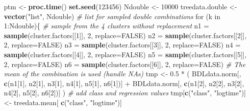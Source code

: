 \documentclass[]{article}
\newenvironment{Shaded}{\begin{snugshade}}{\end{snugshade}}
\newcommand{\KeywordTok}[1]{\textcolor[rgb]{0.13,0.29,0.53}{\textbf{{#1}}}}
\newcommand{\DataTypeTok}[1]{\textcolor[rgb]{0.13,0.29,0.53}{{#1}}}
\newcommand{\DecValTok}[1]{\textcolor[rgb]{0.00,0.00,0.81}{{#1}}}
\newcommand{\FloatTok}[1]{\textcolor[rgb]{0.00,0.00,0.81}{{#1}}}
\newcommand{\StringTok}[1]{\textcolor[rgb]{0.31,0.60,0.02}{{#1}}}
\newcommand{\CommentTok}[1]{\textcolor[rgb]{0.56,0.35,0.01}{\textit{{#1}}}}
\newcommand{\OtherTok}[1]{\textcolor[rgb]{0.56,0.35,0.01}{{#1}}}
\newcommand{\NormalTok}[1]{{#1}}
\begin{document}
\begin{Shaded}
\begin{Highlighting}[]
\NormalTok{ptm <-}\StringTok{ }\KeywordTok{proc.time}\NormalTok{()}
\KeywordTok{set.seed}\NormalTok{(}\DecValTok{123456}\NormalTok{)}
\NormalTok{Ndouble <-}\StringTok{ }\DecValTok{10000}
\NormalTok{treedata.double <-}\StringTok{ }\KeywordTok{vector}\NormalTok{(}\StringTok{"list"}\NormalTok{, Ndouble)  }\CommentTok{# list for sampled double combinations}
\NormalTok{for (k in }\DecValTok{1}\NormalTok{:Ndouble)\{}
  \CommentTok{# sample from the 4 clusters without replacement}
  \NormalTok{n1 =}\StringTok{ }\KeywordTok{sample}\NormalTok{(cluster.factors[[}\DecValTok{1}\NormalTok{]], }\DecValTok{2}\NormalTok{, }\DataTypeTok{replace=}\OtherTok{FALSE}\NormalTok{)  }
  \NormalTok{n2 =}\StringTok{ }\KeywordTok{sample}\NormalTok{(cluster.factors[[}\DecValTok{2}\NormalTok{]], }\DecValTok{2}\NormalTok{, }\DataTypeTok{replace=}\OtherTok{FALSE}\NormalTok{)  }
  \NormalTok{n3 =}\StringTok{ }\KeywordTok{sample}\NormalTok{(cluster.factors[[}\DecValTok{3}\NormalTok{]], }\DecValTok{2}\NormalTok{, }\DataTypeTok{replace=}\OtherTok{FALSE}\NormalTok{)  }
  \NormalTok{n4 =}\StringTok{ }\KeywordTok{sample}\NormalTok{(cluster.factors[[}\DecValTok{4}\NormalTok{]], }\DecValTok{2}\NormalTok{, }\DataTypeTok{replace=}\OtherTok{FALSE}\NormalTok{)  }
  \NormalTok{n5 =}\StringTok{ }\KeywordTok{sample}\NormalTok{(cluster.factors[[}\DecValTok{5}\NormalTok{]], }\DecValTok{2}\NormalTok{, }\DataTypeTok{replace=}\OtherTok{FALSE}\NormalTok{)  }
  \NormalTok{n6 =}\StringTok{ }\KeywordTok{sample}\NormalTok{(cluster.factors[[}\DecValTok{6}\NormalTok{]], }\DecValTok{2}\NormalTok{, }\DataTypeTok{replace=}\OtherTok{FALSE}\NormalTok{)  }
  \CommentTok{# The mean of the combination is used (handle NAs)}
  \NormalTok{tmp <-}\StringTok{ }\FloatTok{0.5} \NormalTok{*}\StringTok{ }\NormalTok{(  BDLdata.norm[, }\KeywordTok{c}\NormalTok{(n1[}\DecValTok{1}\NormalTok{], n2[}\DecValTok{1}\NormalTok{], n3[}\DecValTok{1}\NormalTok{], n4[}\DecValTok{1}\NormalTok{], n5[}\DecValTok{1}\NormalTok{], n6[}\DecValTok{1}\NormalTok{])] }
                \NormalTok{+}\StringTok{ }\NormalTok{BDLdata.norm[, }\KeywordTok{c}\NormalTok{(n1[}\DecValTok{2}\NormalTok{], n2[}\DecValTok{2}\NormalTok{], n3[}\DecValTok{2}\NormalTok{], n4[}\DecValTok{2}\NormalTok{], n5[}\DecValTok{2}\NormalTok{], n6[}\DecValTok{2}\NormalTok{])] )}
   \CommentTok{# add class and regression values}
  \NormalTok{tmp[}\KeywordTok{c}\NormalTok{(}\StringTok{"class"}\NormalTok{, }\StringTok{"logtime"}\NormalTok{)] <-}\StringTok{ }\NormalTok{treedata.mean[ }\KeywordTok{c}\NormalTok{(}\StringTok{"class"}\NormalTok{, }\StringTok{"logtime"}\NormalTok{)]}

\end{Highlighting}
\end{Shaded}
\end{document}
